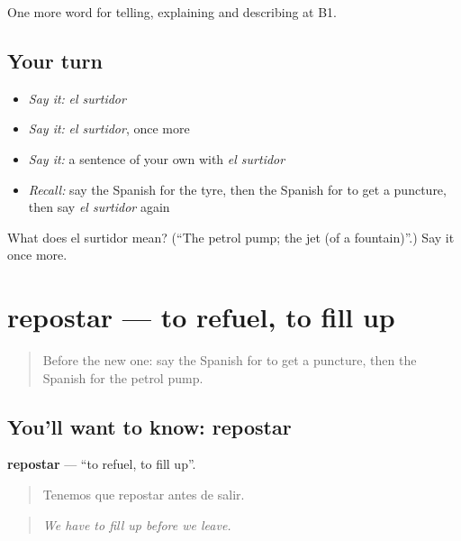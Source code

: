\begin{grammarlens}[title={What you've built}]
One more word for telling, explaining and describing at B1.
\end{grammarlens}

\subsection*{Your turn}
\begin{itemize}
\raggedright
  \item \emph{Say it:} \emph{el surtidor}
  \item \emph{Say it:} \emph{el surtidor}, once more
  \item \emph{Say it:} a sentence of your own with \emph{el surtidor}
  \item \emph{Recall:} say the Spanish for the tyre, then the Spanish for to get a puncture, then say \emph{el surtidor} again
\end{itemize}

\begin{tcolorbox}[breakable,colback=teal!4,colframe=teal!35!black,title={Before you move on}]
What does el surtidor mean? (\textquotedblleft{}The petrol pump; the jet (of a fountain)\textquotedblright{}.) Say it once more.
\end{tcolorbox}
\section[repostar]{repostar — to refuel, to fill up}

\label{lesson:ES-C646-repostar}



\begin{quote}
Before the new one: say the Spanish for to get a puncture, then the Spanish for the petrol pump.
\end{quote}

\subsection*{You'll want to know: repostar}
\textbf{repostar} — \textquotedblleft{}to refuel, to fill up\textquotedblright{}.

\begin{quote}
Tenemos que repostar antes de salir.
\end{quote}

\begin{quote}
\emph{We have to fill up before we leave.}
\end{quote}

